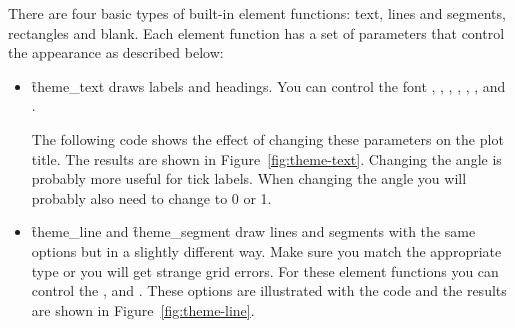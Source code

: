 There are four basic types of built-in element functions: text, lines and segments, rectangles and blank.  Each element function has a set of parameters that control the appearance as described below:

\begin{itemize}
  \item \f{theme_text} draws labels and headings. You can control the font , , , , , ,  and .
  
  The following code shows the effect of changing these parameters on the plot title. The results are shown in Figure~\ref{fig:theme-text}. Changing the angle is probably more useful for tick labels.  When changing the angle you will probably also need to change  to 0 or 1.
  
    

  \item \f{theme_line} and \f{theme_segment} draw lines and segments with the same options but in a slightly different way.  Make sure you match the appropriate type or you will get strange grid errors.  For these element functions you can control the ,  and .  These options are illustrated with the code and the results are shown in Figure~\ref{fig:theme-line}.

    


\end{itemize}
